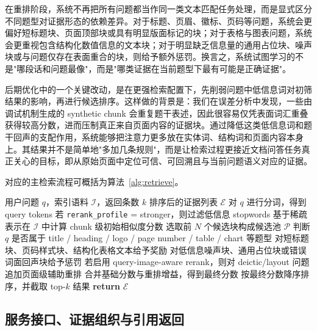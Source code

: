 \documentclass{SYSUReport}
\begin{document}
在重排阶段，系统不再把所有问题都当作同一类文本匹配任务处理，而是显式区分不同题型对证据形态的依赖差异。对于标题、页眉、徽标、页码等问题，系统会更偏好短标题块、页面顶部块或具有明显版面标记的块；对于表格与图表问题，系统会更重视包含结构化数值信息的文本块；对于明显缺乏信息量的通用占位块、噪声块或与问题仅存在表面重合的块，则给予额外惩罚。换言之，系统试图学习的不是"哪段话和问题最像"，而是"哪类证据在当前题型下最有可能是正确证据"。

后期优化中的一个关键改动，是在更强检索配置下，先削弱问题中低信息词对初筛结果的影响，再进行候选排序。这样做的背景是：我们在误差分析中发现，一些由调试机制生成的 synthetic chunk 会重复题干表述，因此很容易仅凭表面词汇重叠获得较高分数，进而压制真正来自页面内容的证据块。通过降低这类低信息词和题干回声的支配作用，系统能够把注意力更多放在实体词、结构词和页面内容本身上。其结果并不是简单地"多加几条规则"，而是让检索过程更接近文档问答任务真正关心的目标，即从原始页面中定位可信、可回溯且与当前问题语义对应的证据。

对应的主检索流程可概括为算法~\ref{alg:retrieve}。

\begin{algorithm}[!htbp]
    \caption{文本优先检索与重排流程}
    \label{alg:retrieve}
    \begin{algorithmic}[1]
        \REQUIRE 用户问题 $q$，索引语料 $\mathcal{I}$，返回条数 $k$
        \ENSURE 排序后的证据列表 $\mathcal{E}$
        \STATE 对 $q$ 进行分词，得到 query tokens
        \STATE 若 \texttt{rerank\_profile} = stronger，则过滤低信息 stopwords
        \STATE 基于稀疏表示在 $\mathcal{I}$ 中计算 chunk 级初始相似度分数
        \STATE 选取前 $N$ 个候选块构成候选池 $\mathcal{P}$
            \STATE 判断 $q$ 是否属于 title / heading / logo / page number / table / chart 等题型
            \STATE 对短标题块、页码样式块、结构化表格文本给予奖励
            \STATE 对低信息噪声块、通用占位块或错误词面回声块给予惩罚
            \STATE 若启用 query-image-aware rerank，则对 deictic/layout 问题追加页面级辅助重排
        \ENDFOR
        \STATE 合并基础分数与重排增益，得到最终分数
        \STATE 按最终分数降序排序，并截取 top-$k$ 结果
        \STATE \textbf{return} $\mathcal{E}$
    \end{algorithmic}
\end{algorithm}

\subsection{服务接口、证据组织与引用返回}
\end{document}
